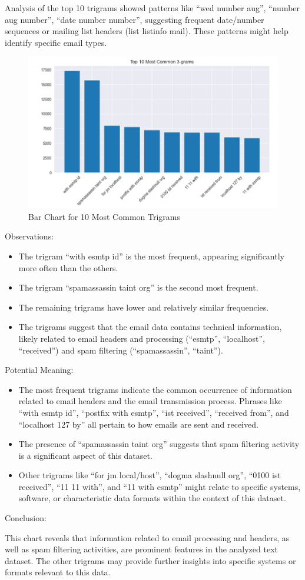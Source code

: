 Analysis of the top 10 trigrams showed patterns like ``wed number aug'', ``number aug number'', ``date number number'', suggesting frequent date/number sequences or mailing list headers (list listinfo mail).
These patterns might help identify specific email types.

\begin{figure}[H]
    \centering
    \includegraphics[width=\linewidth]{images/common_tri_grams}
    \caption{Bar Chart for 10 Most Common Trigrams}
    \label{fig:common_tri_grams}
\end{figure}

Observations:
\begin{itemize}
    \item The trigram ``with esmtp id'' is the most frequent, appearing significantly more often than the others.
    \item The trigram ``spamassassin taint org'' is the second most frequent.
    \item The remaining trigrams have lower and relatively similar frequencies.
    \item The trigrams suggest that the email data contains technical information, likely related to email headers and processing (``esmtp'', ``localhost'', ``received'') and spam filtering (``spamassassin'', ``taint'').
\end{itemize}

Potential Meaning:
\begin{itemize}
    \item The most frequent trigrams indicate the common occurrence of information related to email headers and the email transmission process.
    Phrases like ``with esmtp id'', ``postfix with esmtp'', ``ist received'', ``received from'', and ``localhost 127 by'' all pertain to how emails are sent and received.
    \item The presence of ``spamassassin taint org'' suggests that spam filtering activity is a significant aspect of this dataset.
    \item Other trigrams like ``for jm local/host'', ``dogma slashnull org'', ``0100 ist received'', ``11 11 with'', and ``11 with esmtp'' might relate to specific systems, software, or characteristic data formats within the context of this dataset.
\end{itemize}

Conclusion:

This chart reveals that information related to email processing and headers, as well as spam filtering activities, are prominent features in the analyzed text dataset.
The other trigrams may provide further insights into specific systems or formats relevant to this data.